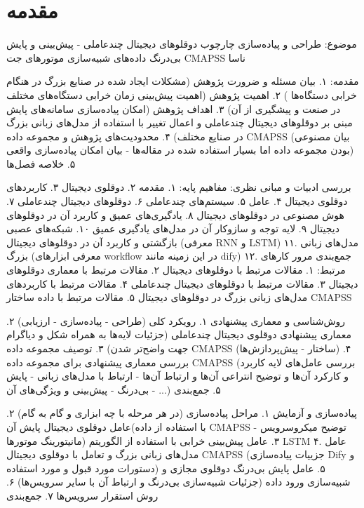 \chapter{مقدمه}

موضوع: طراحی و پیاده‌سازی چارچوب دوقلوهای دیجیتال چندعاملی - پیش‌بینی‌ و پایش بی‌درنگ داده‌های شبیه‌سازی موتورهای جت CMAPSS ناسا

مقدمه:
۱. بیان مسئله و ضرورت پژوهش (مشکلات ایجاد شده در صنایع بزرگ در هنگام خرابی دستگاه‌ها )
۲. اهمیت پژوهش (اهمیت پیش‌بینی زمان خرابی دستگاه‌های مختلف در صنعت و پیشگیری از آن)
۳. اهداف پژوهش (امکان پیاده‌سازی سامانه‌های پایش مبنی بر دوقلو‌های دیجیتال چندعاملی و اعمال تغییر با استفاده از مدل‌های زبانی بزرگ در صنایع مختلف)
۴. محدودیت‌های پژوهش و مجموعه داده CMAPSS (بیان مصنوعی بودن مجموعه داده اما بسیار استفاده شده در مقاله‌ها - بیان امکان پیاده‌سازی واقعی)
۵. خلاصه فصل‌ها

بررسی ادبیات و مبانی نظری:
مفاهیم پایه:
۱. مقدمه
۲. دوقلوی دیجیتال
۳. کاربرد‌های دوقلوی دیجیتال
۴. عامل
۵. سیستم‌های چندعاملی
۶. دوقلو‌های دیجیتال چندعاملی
۷. هوش مصنوعی در دوقلوهای دیجیتال
۸. یادگیری‌های عمیق و کاربرد آن در دوقلو‌های دیجیتال
۹. لایه توجه و سازوکار آن در مدل‌‌های یادگیری‌ عمیق
۱۰. شبکه‌های عصبی بازگشتی و کاربرد آن در دوقلو‌های دیجیتال (معرفی RNN و LSTM)
۱۱. مدل‌های زبانی بزرگ (معرفی ابزار‌های workflow در این زمینه مانند dify)
۱۲. جمع‌بندی
مرور کار‌های مرتبط:
۱. مقالات مرتبط با دوقلو‌های دیجیتال
۲. مقالات مرتبط با معماری دوقلو‌های دیجیتال
۳. مقالات مرتبط با دوقلو‌های دیجیتال چندعاملی
۴. مقالات مرتبط با کاربرد‌های مدل‌های زبانی بزرگ در دوقلو‌های دیجیتال
۵. مقالات مرتبط با داده ساختار CMAPSS

روش‌شناسی و معماری پیشنهادی
۱. رویکرد کلی (طراحی - پیاده‌سازی - ارزیابی)
۲. معماری پیشنهادی دوقلوی دیجیتال چندعاملی (جزئیات لایه‌ها به همراه شکل و دیاگرام جهت واضح‌تر شدن)
۳. توصیف مجموعه داده CMAPSS (ساختار - پیش‌پردازش‌ها)
۴. بررسی معماری پیشنهادی برای مجموعه داده CMAPSS (بررسی عامل‌های لایه کاربرد و کارکرد آن‌ها و توضیح انتراعی آن‌ها و ارتباط آن‌ها - ارتباط با مدل‌های زبانی - پایش بی‌درنگ - پیش‌بینی و ویژگی‌های آن - ...)
۵. جمع‌بندی

پیاده‌سازی و آزمایش
۱. مراحل پیاده‌سازی (در هر مرحله با چه ابزاری و گام به گام)
۲. عامل دوقلوی دیجیتال پایش آن(با استفاده از داده‌ CMAPSS - توضیح میکروسرویس مانیتورینگ موتور‌ها)
۳. عامل پیش‌بینی خرابی با استفاده از الگوریتم LSTM
۴. عامل مدل‌های زبانی بزرگ و تعامل با دوقلوی دیجیتال CMAPSS (جزییات پیاده‌سازی Dify و دستورات مورد قبول و مورد استفاده)
۵. عامل پایش بی‌درنگ دوقلوی مجازی و شبیه‌سازی ورود داده (جزئیات شبیه‌سازی بی‌درنگ و ارتباط آن با سایر سرویس‌ها)
۶. روش استقرار سرویس‌ها
۷. جمع‌بندی

